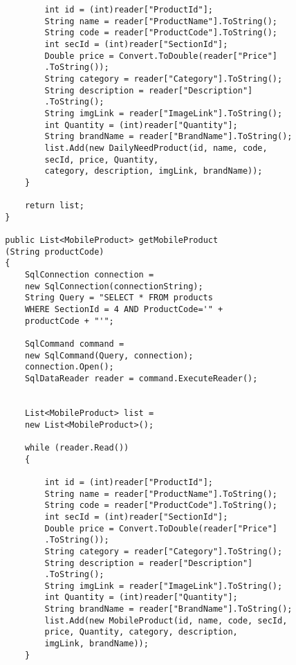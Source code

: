 \begin{lstlisting}
                int id = (int)reader["ProductId"];
                String name = reader["ProductName"].ToString();
                String code = reader["ProductCode"].ToString();
                int secId = (int)reader["SectionId"];
                Double price = Convert.ToDouble(reader["Price"]
                .ToString());
                String category = reader["Category"].ToString();
                String description = reader["Description"]
                .ToString();
                String imgLink = reader["ImageLink"].ToString();
                int Quantity = (int)reader["Quantity"];
                String brandName = reader["BrandName"].ToString();
                list.Add(new DailyNeedProduct(id, name, code, 
                secId, price, Quantity, 
                category, description, imgLink, brandName));
            }

            return list;
        }

        public List<MobileProduct> getMobileProduct
        (String productCode)
        {
            SqlConnection connection =
            new SqlConnection(connectionString);
            String Query = "SELECT * FROM products 
            WHERE SectionId = 4 AND ProductCode='" + 
            productCode + "'";

            SqlCommand command = 
            new SqlCommand(Query, connection);
            connection.Open();
            SqlDataReader reader = command.ExecuteReader();


            List<MobileProduct> list = 
            new List<MobileProduct>();

            while (reader.Read())
            {

                int id = (int)reader["ProductId"];
                String name = reader["ProductName"].ToString();
                String code = reader["ProductCode"].ToString();
                int secId = (int)reader["SectionId"];
                Double price = Convert.ToDouble(reader["Price"]
                .ToString());
                String category = reader["Category"].ToString();
                String description = reader["Description"]
                .ToString();
                String imgLink = reader["ImageLink"].ToString();
                int Quantity = (int)reader["Quantity"];
                String brandName = reader["BrandName"].ToString();
                list.Add(new MobileProduct(id, name, code, secId, 
                price, Quantity, category, description, 
                imgLink, brandName));
            }


\end{lstlisting}
